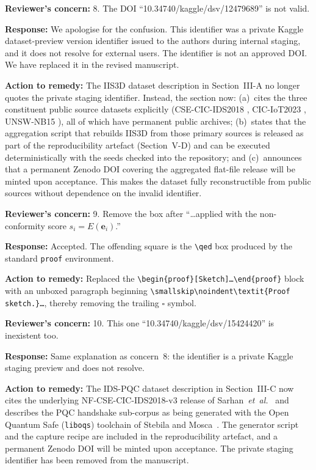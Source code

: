 \documentclass[11pt,a4paper]{article}
\newcommand{\Concern}[1]{\smallskip\noindent\textbf{\textcolor{concern}{Reviewer's concern:}} #1\par}
\newcommand{\Response}[1]{\noindent\textbf{\textcolor{response}{Response:}} #1\par}
\newcommand{\Action}[1]{\noindent\textbf{\textcolor{action}{Action to remedy:}} #1\par}
\begin{document}
\Concern{8. The DOI ``10.34740/kaggle/dsv/12479689'' is not valid.}
\Response{We apologise for the confusion. This identifier was a private Kaggle dataset-preview version identifier issued to the authors during internal staging, and it does not resolve for external users. The identifier is not an approved DOI. We have replaced it in the revised manuscript.}
\Action{The IIS3D dataset description in Section~III-A no longer quotes the private staging identifier. Instead, the section now: (a)~cites the three constituent public source datasets explicitly (CSE-CIC-IDS2018 \cite{sharafaldin2018cicids}, CIC-IoT2023 \cite{neto2023ciciot}, UNSW-NB15 \cite{moustafa2015unswnb15}), all of which have permanent public archives; (b)~states that the aggregation script that rebuilds IIS3D from those primary sources is released as part of the reproducibility artefact (Section~V-D) and can be executed deterministically with the seeds checked into the repository; and (c)~announces that a permanent Zenodo DOI covering the aggregated flat-file release will be minted upon acceptance. This makes the dataset fully reconstructible from public sources without dependence on the invalid identifier.}

\Concern{9. Remove the box after ``\ldots applied with the non-conformity score $s_i = E(\mathbf{e}_i)$.''}
\Response{Accepted. The offending square is the \texttt{\textbackslash qed} box produced by the standard \texttt{proof} environment.}
\Action{Replaced the \texttt{\textbackslash begin\{proof\}[Sketch]\ldots\textbackslash end\{proof\}} block with an unboxed paragraph beginning \texttt{\textbackslash smallskip\textbackslash noindent\textbackslash textit\{Proof sketch.\}\ldots}, thereby removing the trailing $\square$ symbol.}

\Concern{10. This one ``10.34740/kaggle/dsv/15424420'' is inexistent too.}
\Response{Same explanation as concern~8: the identifier is a private Kaggle staging preview and does not resolve.}
\Action{The IDS-PQC dataset description in Section~III-C now cites the underlying NF-CSE-CIC-IDS2018-v3 release of Sarhan~\emph{et~al.}~\cite{sarhan2022standard} and describes the PQC handshake sub-corpus as being generated with the Open Quantum Safe (\texttt{liboqs}) toolchain of Stebila and Mosca~\cite{stebila2020liboqs}. The generator script and the capture recipe are included in the reproducibility artefact, and a permanent Zenodo DOI will be minted upon acceptance. The private staging identifier has been removed from the manuscript.}
\end{document}
